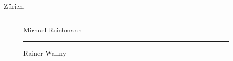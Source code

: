 \vfill\noindent
Z\"urich, \@date
\vspace*{1.5cm}
\begin{figure}[h]\centering
  \begin{minipage}{.45\linewidth}
    \hrule\vspace*{4pt}
    Michael Reichmann
  \end{minipage}
  \hfill
  \begin{minipage}{.45\linewidth}
    \hrule\vspace*{4pt}
    Rainer Wallny
  \end{minipage}
\end{figure}